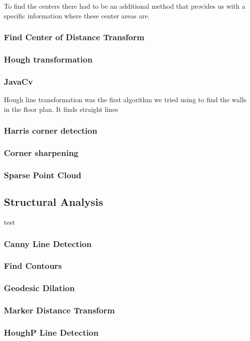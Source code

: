 To find the centers there had to be an additional method that provides us with a specific information where these center areas are.
\subsubsection{Find Center of Distance Transform}  
\subsubsection{Hough transformation}
\subsubsection{JavaCv}
Hough line transformation was the first algorithm we tried using to find the walls in the floor plan. It finds straight lines  
\subsubsection{Harris corner detection}
\subsubsection{Corner sharpening}
\subsubsection{Sparse Point Cloud}
\subsection{Structural Analysis}
test
\subsubsection{Canny Line Detection} 
\subsubsection{Find Contours}
\subsubsection{Geodesic Dilation}
\subsubsection{Marker Distance Transform}
\subsubsection{HoughP Line Detection}
